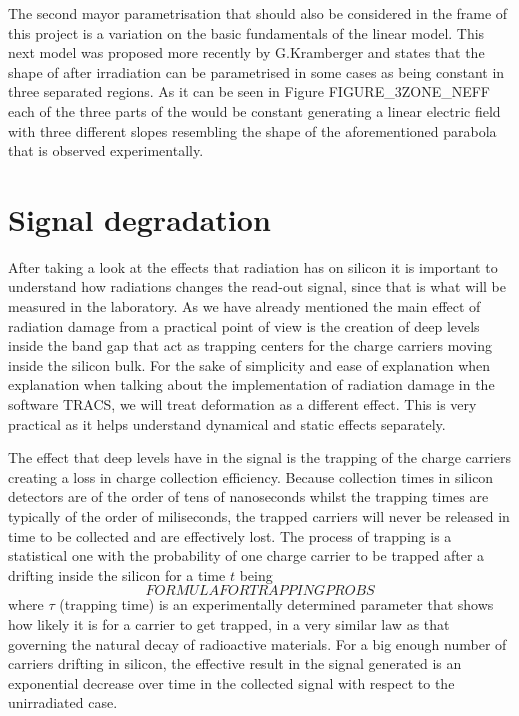 The second mayor parametrisation that should also be considered in the frame of this project is a variation on the basic fundamentals of the linear model. This next model was proposed more recently by G.Kramberger and states that the shape of \neff after irradiation can be parametrised in some cases as being constant in three separated regions. As it can be seen in Figure FIGURE\_3ZONE\_NEFF each of the three parts of the \neff would be constant generating a linear electric field with three different slopes resembling the shape of the aforementioned parabola that is observed experimentally.


\section{Signal degradation}

After taking a look at the effects that radiation has on silicon it is important to understand how radiations changes the read-out signal, since that is what will be measured in the laboratory. As we have already mentioned the main effect of radiation damage from a practical point of view is the creation of deep levels inside the band gap that act as trapping centers for the charge carriers moving inside the silicon bulk. For the sake of simplicity and ease of explanation when explanation when talking about the implementation of radiation damage in the software TRACS, we will treat \neff deformation as a different effect. This is very practical as it helps understand dynamical and static effects separately. 

The effect that deep levels have in the signal is the trapping of the charge carriers creating a loss in charge collection efficiency. Because collection times in silicon detectors are of the order of tens of nanoseconds whilst the trapping times are typically of the order of miliseconds, the trapped carriers will never be released in time to be collected and are effectively lost. The process of trapping is a statistical one with the probability of one charge carrier to be trapped after a drifting inside the silicon for a time $t$ being  \[FORMULA FOR TRAPPING PROBS\] where $\tau$ (trapping time) is an experimentally determined parameter that shows how likely it is for a carrier to get trapped, in a very similar law as that governing the natural decay of radioactive materials. For a big enough number of carriers drifting in silicon, the effective result in the signal generated is an exponential decrease over time in the collected signal with respect to the unirradiated case. 

